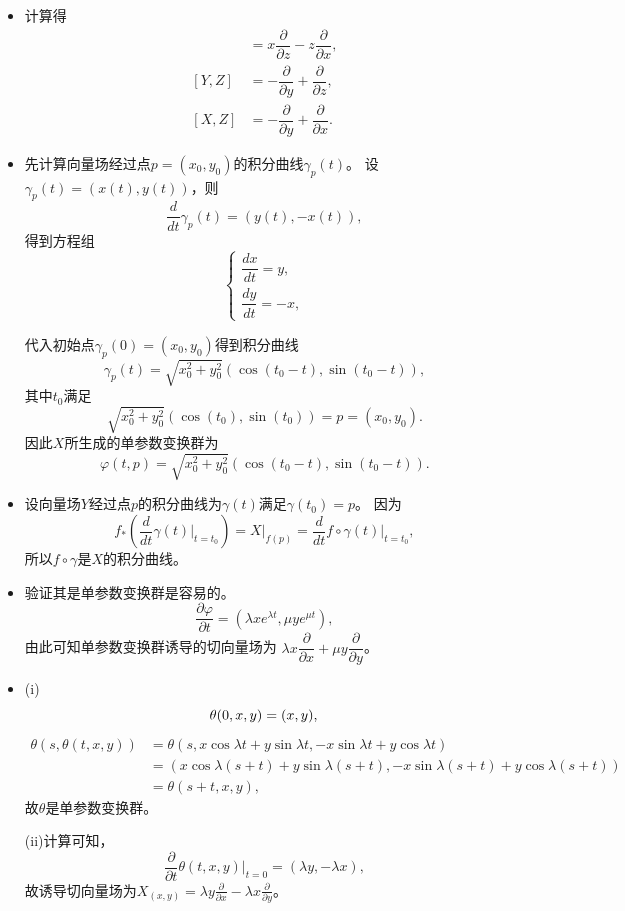 \begin {itemize}
\item[12.]
    计算得
    \begin{align*}
        [X,Y]&=x\dfrac{\partial}{\partial z}-z\dfrac{\partial}{\partial x},\\
        [Y,Z]&=-\dfrac{\partial}{\partial y}+\dfrac{\partial}{\partial z},\\
        [X,Z]&=-\dfrac{\partial}{\partial y}+\dfrac{\partial}{\partial x}.
    \end{align*}

\item[13.]
    先计算向量场经过点$p=(x_0,y_0)$的积分曲线$\gamma_p(t)$。
    设$\gamma_p(t)=(x(t),y(t))$，则
    \[\dfrac{d}{dt}\gamma_p(t)=(y(t),-x(t)),\]
    得到方程组
    \begin{equation*}\begin{cases}
        \dfrac{dx}{dt}=y,\\
        \dfrac{dy}{dt}=-x,
    \end{cases}\end{equation*}
    
    代入初始点$\gamma_p(0)=(x_0,y_0)$得到积分曲线
    \[\gamma_p(t)=\sqrt{x_0^2+y_0^2}(\cos(t_0-t),\sin(t_0-t)),\]
    其中$t_0$满足
    \[\sqrt{x_0^2+y_0^2}(\cos(t_0),\sin(t_0))=p=(x_0,y_0).\]
    因此$X$所生成的单参数变换群为
    \[\varphi (t,p)=\sqrt{x_0^2+y_0^2}(\cos(t_0-t),\sin(t_0-t)).\]

\item[14.]
    设向量场$Y$经过点$p$的积分曲线为$\gamma(t)$满足$\gamma(t_0)=p$。
    因为
    \[f_*(\dfrac{d}{dt}\gamma(t)\bigg|_{t=t_0})=X\big |_{f(p)}
    =\dfrac{d}{dt}f\circ\gamma(t)\bigg|_{t=t_0},\]
    所以$f\circ\gamma$是$X$的积分曲线。

\item[15.]
    验证其是单参数变换群是容易的。
    \[\dfrac{\partial\varphi}{\partial t}=(\lambda xe^{\lambda t},\mu y e^{\mu t}),\]
    由此可知单参数变换群诱导的切向量场为
    $\lambda x\dfrac{\partial}{\partial x}+\mu y\dfrac{\partial}{\partial y}$。

    \item[16.](i)
    \begin{equation*}
		\theta(0,x,y)=(x,y),\\
	\end{equation*}
	\begin{align*}
		\theta(s,\theta(t,x,y))&=\theta(s,x\cos\lambda t+y\sin\lambda t,-x\sin\lambda t+y\cos\lambda t)\\
		&=(x\cos\lambda(s+t)+y\sin\lambda(s+t),-x\sin\lambda(s+t)+y\cos\lambda(s+t))\\
		&=\theta(s+t,x,y),
	\end{align*}
	故$\theta$是单参数变换群。\par
	(ii)计算可知，
	\begin{equation*}
		\frac{\partial}{\partial t}\theta(t,x,y)|_{t=0}=(\lambda y,-\lambda x),
	\end{equation*}
	故诱导切向量场为$X_{(x,y)}=\lambda y\frac{\partial}{\partial x}
    -\lambda x\frac{\partial}{\partial y}$。


\end{itemize}
